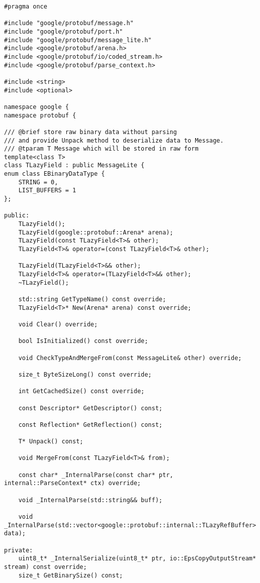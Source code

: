 \footnotesize
\begin{lstlisting}[style=CodeListing]
#pragma once

#include "google/protobuf/message.h"
#include "google/protobuf/port.h"
#include "google/protobuf/message_lite.h"
#include <google/protobuf/arena.h>
#include <google/protobuf/io/coded_stream.h>
#include <google/protobuf/parse_context.h>

#include <string>
#include <optional>

namespace google {
namespace protobuf {

/// @brief store raw binary data without parsing
/// and provide Unpack method to deserialize data to Message.
/// @tparam T Message which will be stored in raw form
template<class T>
class TLazyField : public MessageLite {
enum class EBinaryDataType {
    STRING = 0,
    LIST_BUFFERS = 1
};

public:
    TLazyField();
    TLazyField(google::protobuf::Arena* arena);
    TLazyField(const TLazyField<T>& other);
    TLazyField<T>& operator=(const TLazyField<T>& other);

    TLazyField(TLazyField<T>&& other);
    TLazyField<T>& operator=(TLazyField<T>&& other);
    ~TLazyField();

    std::string GetTypeName() const override;
    TLazyField<T>* New(Arena* arena) const override;

    void Clear() override;

    bool IsInitialized() const override;

    void CheckTypeAndMergeFrom(const MessageLite& other) override;

    size_t ByteSizeLong() const override;

    int GetCachedSize() const override;

    const Descriptor* GetDescriptor() const;

    const Reflection* GetReflection() const;

    T* Unpack() const;

    void MergeFrom(const TLazyField<T>& from);

    const char* _InternalParse(const char* ptr, internal::ParseContext* ctx) override;

    void _InternalParse(std::string&& buff);

    void _InternalParse(std::vector<google::protobuf::internal::TLazyRefBuffer> data);

private:
    uint8_t* _InternalSerialize(uint8_t* ptr, io::EpsCopyOutputStream* stream) const override;
    size_t GetBinarySize() const;


\end{lstlisting}
